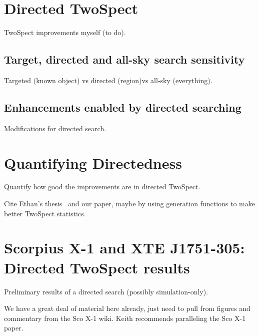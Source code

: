 


        

        \section{Directed TwoSpect}
        \label{directed}

            TwoSpect improvements myself (to do).

            \subsection{Target, directed and all-sky search sensitivity}
            \label{tradeoffs}

                Targeted (known object) vs directed (region)vs all-sky (everything).

            \subsection{Enhancements enabled by directed searching}
            \label{directed_enhancements}

                Modifications for directed search.

        \section{Quantifying Directedness}
        \label{quant_directed}
        
            Quantify how good the improvements are in directed TwoSpect. 

            Cite Ethan's thesis~\cite{RomeroThesis} and our paper, maybe by using generation functions to make better TwoSpect statistics.

        \section{Scorpius X-1 and XTE J1751-305: Directed TwoSpect results}
        \label{directed_results}
 
            Preliminary results of a directed search (possibly simulation-only).

            We have a great deal of material here already, just need to pull from figures and commentary from the Sco X-1 wiki. Keith recommends paralleling the Sco X-1 paper.





